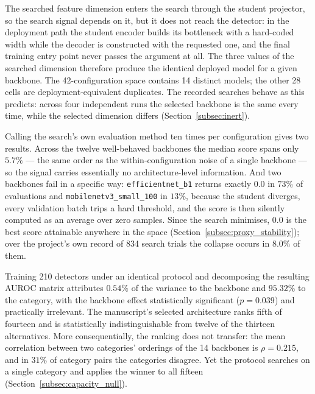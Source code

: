 The searched feature dimension enters the search through the student projector, so
the search signal depends on it, but it does not reach the detector: in the
deployment path the student encoder builds its bottleneck with a hard-coded width
while the decoder is constructed with the requested one, and the final training
entry point never passes the argument at all. The three values of the searched
dimension therefore produce the identical deployed model for a given backbone. The
42-configuration space contains 14 distinct models; the other 28 cells are
deployment-equivalent duplicates. The recorded searches behave as this predicts:
across four independent runs the selected backbone is the same every time, while
the selected dimension differs (Section~\ref{subsec:inert}).

 Calling the search's own evaluation method ten times per
configuration gives two results. Across the twelve well-behaved backbones the
median score spans only $5.7\%$ --- the same order as the within-configuration
noise of a single backbone --- so the signal carries essentially no
architecture-level information. And two backbones fail in a specific way:
\texttt{efficientnet\_b1} returns exactly $0.0$ in $73\%$ of evaluations and
\texttt{mobilenetv3\_small\_100} in $13\%$, because the student diverges, every
validation batch trips a hard threshold, and the score is then silently computed
as an average over zero samples. Since the search minimises, $0.0$ is the best
score attainable anywhere in the space
(Section~\ref{subsec:proxy_stability}); over the project's own record of 834
search trials the collapse occurs in $8.0\%$ of them.

Training 210 detectors under an identical protocol and decomposing the resulting
AUROC matrix attributes $0.54\%$ of the variance to the backbone and $95.32\%$ to
the category, with the backbone effect statistically significant ($p = 0.039$) and
practically irrelevant. The manuscript's selected architecture ranks fifth of
fourteen and is statistically indistinguishable from twelve of the thirteen
alternatives. More consequentially, the ranking does not transfer: the mean
correlation between two categories' orderings of the 14 backbones is
$\rho = 0.215$, and in $31\%$ of category pairs the categories disagree. Yet the
protocol searches on a single category and applies the winner to all fifteen
(Section~\ref{subsec:capacity_null}).

